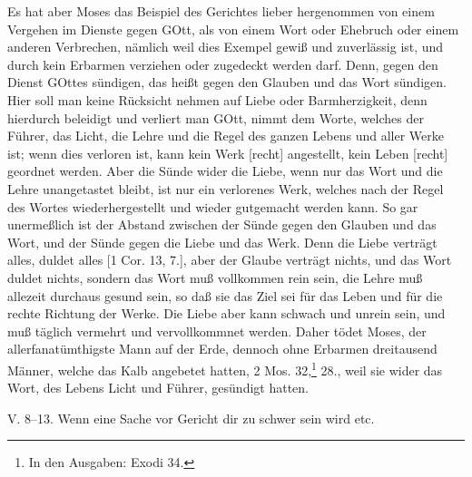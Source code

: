Es hat aber Moses das Beispiel des Gerichtes lieber hergenommen von einem Vergehen im Dienste gegen GOtt, als von einem Wort oder Ehebruch oder einem anderen Verbrechen, nämlich weil dies Exempel gewiß und zuverlässig ist, und durch kein Erbarmen verziehen oder zugedeckt werden darf. Denn, gegen den Dienst GOttes sündigen, das heißt gegen den Glauben und das Wort sündigen. Hier soll man keine Rücksicht nehmen auf Liebe oder Barmherzigkeit, denn hierdurch beleidigt und verliert man GOtt, nimmt dem Worte, welches der Führer, das Licht, die Lehre und die Regel des ganzen Lebens und aller Werke ist; wenn dies verloren ist, kann kein Werk [recht] angestellt, kein Leben [recht] geordnet werden. Aber die Sünde wider die Liebe, wenn nur das Wort und die Lehre unangetastet bleibt, ist nur ein verlorenes Werk, welches nach der Regel des Wortes wiederhergestellt und wieder gutgemacht werden kann. So gar unermeßlich ist der Abstand zwischen der Sünde gegen den Glauben und das Wort, und der Sünde gegen die Liebe und das Werk. Denn die Liebe verträgt alles, duldet alles [1 Cor. 13, 7.], aber der Glaube verträgt nichts, und das Wort duldet nichts, sondern das Wort muß vollkommen rein sein, die Lehre muß allezeit durchaus gesund sein, so daß sie das Ziel sei für das Leben und für die rechte Richtung der Werke. Die Liebe aber kann schwach und unrein sein, und muß täglich vermehrt und vervollkommnet werden. Daher tödet Moses, der allerfanatümthigste Mann auf der Erde, dennoch ohne Erbarmen dreitausend Männer, welche das Kalb angebetet hatten, 2 Mos. 32,\footnote{In den Ausgaben: Exodi 34.} 28., weil sie wider das Wort, des Lebens Licht und Führer, gesündigt hatten.

\begin{schriftzitat}
V. 8–13. Wenn eine Sache vor Gericht dir zu schwer sein wird etc.
\end{schriftzitat}

